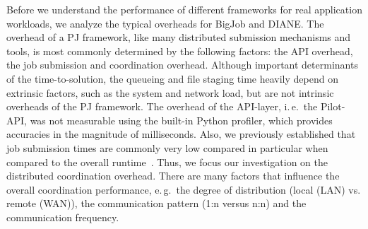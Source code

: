 \documentclass[conference]{IEEEtran}
\begin{document}

Before we understand the performance of different frameworks for real
application workloads, we analyze the typical overheads for BigJob and DIANE.
The overhead of a PJ framework, like many
distributed submission mechanisms and tools, is most commonly determined by
the following factors: the API overhead, the job submission and coordination
overhead. Although important determinants of the time-to-solution, the
queueing and file staging time heavily depend on extrinsic factors, such as
the system and network load, but are not intrinsic overheads of the PJ
framework. The overhead of the API-layer, i.\,e.\ the Pilot-API, was not 
measurable using the built-in Python profiler, which provides accuracies in 
the magnitude of milliseconds. Also, we previously established that job 
submission times are commonly very low compared in particular when compared to 
the overall runtime~\cite{saga_europar10}.  Thus, we focus our investigation on the distributed coordination overhead. There are many factors
that influence the overall coordination performance, e.\,g.\ the
degree of distribution (local (LAN) vs. remote (WAN)), the
communication pattern (1:n versus n:n) and the communication
frequency.




 





\end{document}

